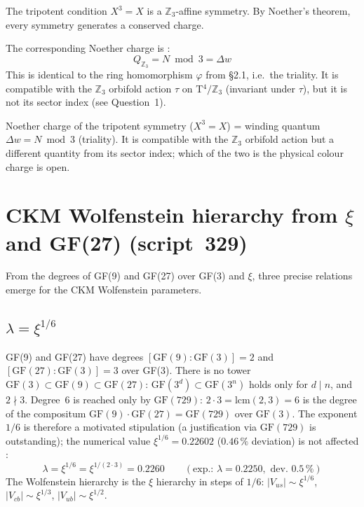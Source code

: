 The tripotent condition $X^3 = X$ is a $\mathbb{Z}_3$-affine symmetry.
By Noether's theorem, every symmetry generates a conserved charge.

The corresponding Noether charge is \BM:
\begin{equation}
  Q_{\mathbb{Z}_3} = N \bmod 3 = \Delta w
\end{equation}
This is identical to the ring homomorphism $\varphi$ from §2.1,
i.e.\ the triality. It is compatible with the $\mathbb{Z}_3$ orbifold action
$\tau$ on T$^4/\mathbb{Z}_3$ (invariant under $\tau$), but it is not its
sector index (see Question~1).

\begin{keyresult}[Status~\BM]
Noether charge of the tripotent symmetry ($X^3=X$) = winding quantum $\Delta w = N\bmod 3$ (triality).
It is compatible with the $\mathbb{Z}_3$ orbifold action but a different quantity from
its sector index; which of the two is the physical colour charge is open.
\end{keyresult}

\section{CKM Wolfenstein hierarchy from $\xi$ and GF(27) (script~329)}
\label{sec:ckm}

From the degrees of GF(9) and GF(27) over GF(3) and $\xi$, three precise
relations emerge for the CKM Wolfenstein parameters.

\subsection{$\lambda = \xi^{1/6}$}

GF(9) and GF(27) have degrees $[\mathrm{GF}(9):\mathrm{GF}(3)] = 2$ and
$[\mathrm{GF}(27):\mathrm{GF}(3)] = 3$ over GF(3). There is no tower
$\mathrm{GF}(3) \subset \mathrm{GF}(9) \subset \mathrm{GF}(27)$:
$\mathrm{GF}(3^d)\subset\mathrm{GF}(3^n)$ holds only for $d \mid n$, and $2 \nmid 3$.
Degree~6 is reached only by $\mathrm{GF}(729)$: $2\cdot 3 = \mathrm{lcm}(2,3) = 6$ is
the degree of the compositum $\mathrm{GF}(9)\cdot\mathrm{GF}(27) = \mathrm{GF}(729)$
over $\mathrm{GF}(3)$. The exponent $1/6$ is therefore a motivated stipulation
(a justification via $\mathrm{GF}(729)$ is outstanding); the numerical value
$\xi^{1/6} = 0.22602$ ($0.46\,\%$ deviation) is not affected \KM:
\begin{equation}
  \lambda = \xi^{1/6} = \xi^{1/(2\cdot 3)} = 0.2260
  \qquad (\text{exp.: } \lambda = 0.2250, \text{ dev. } 0.5\,\%)
\end{equation}
The Wolfenstein hierarchy is the $\xi$ hierarchy in steps of $1/6$:
$|V_{us}|\sim\xi^{1/6}$, $|V_{cb}|\sim\xi^{1/3}$, $|V_{ub}|\sim\xi^{1/2}$.

